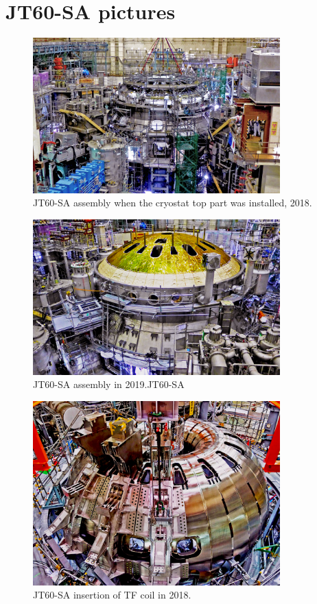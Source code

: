 \chapter{JT60-SA pictures}
\label{JT60_append}
\begin{figure}
	\centering
	\includegraphics[width=0.85\textwidth]{AppCont/image0.jpg}
	\caption{ JT60-SA assembly when the cryostat top part was installed, 2018.\label{figure0}}
\end{figure}
\begin{figure}
	\centering
	\includegraphics[width=0.85\textwidth]{AppCont/image1.jpg}
	\caption{ JT60-SA assembly in 2019.JT60-SA\label{figure1}}
\end{figure}
\begin{figure}
	\centering
	\includegraphics[width=0.85\textwidth]{AppCont/image2.jpg}
	\caption{ JT60-SA insertion of TF coil in 2018.\label{figure2}}
\end{figure}
